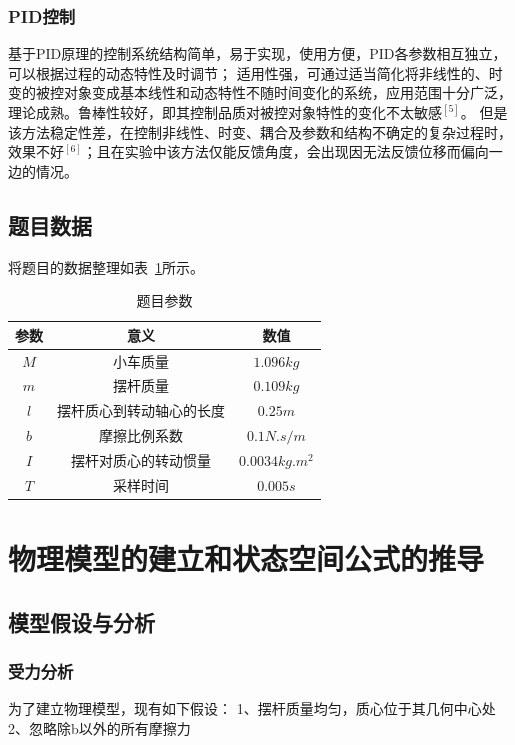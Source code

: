 \subsection{PID控制}
基于PID原理的控制系统结构简单，易于实现，使用方便，PID各参数相互独立，可以根据过程的动态特性及时调节；
适用性强，可通过适当简化将非线性的、时变的被控对象变成基本线性和动态特性不随时间变化的系统，应用范围十分广泛，理论成熟。鲁棒性较好，即其控制品质对被控对象特性的变化不太敏感$^{[5]}$。
但是该方法稳定性差，在控制非线性、时变、耦合及参数和结构不确定的复杂过程时，效果不好$^{[6]}$；且在实验中该方法仅能反馈角度，会出现因无法反馈位移而偏向一边的情况。

\section{题目数据}

将题目的数据整理如表~\ref{para}所示。

\begin{table}[h]
\centering
\begin{tabular}{ccc}
\hline
参数 & 意义           & 数值                            \\ \hline
$M$  & 小车质量         & $1.096kg$                       \\ \hline
$m$ & 摆杆质量         & $0.109kg$                       \\ \hline
$l$  & 摆杆质心到转动轴心的长度 & $0.25m$                         \\ \hline
$b$  & 摩擦比例系数       & $0.1N.s/m$                      \\ \hline
$I$  & 摆杆对质心的转动惯量   & $0.0034kg.m^2$ \\ \hline
$T$  & 采样时间         & $0.005s$                        \\ \hline
\end{tabular}
\caption{题目参数}\label{para}
\end{table}

\chapter{物理模型的建立和状态空间公式的推导}

\section{模型假设与分析}
\subsection{受力分析}
为了建立物理模型，现有如下假设：
1、摆杆质量均匀，质心位于其几何中心处
2、忽略除b以外的所有摩擦力

